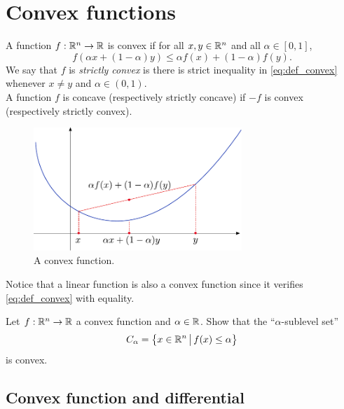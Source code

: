 \documentclass[11pt,nocut]{article}
\begin{document}
\section{Convex functions}

\begin{definition}
	A function $f: \mathbb{R}^n \to \mathbb{R}$ is convex if for all $x,y \in \mathbb{R}^n$ and all $\alpha \in [0,1]$,
	\begin{equation}\label{eq:def_convex}
	f(\alpha x + (1-\alpha) y) \leq \alpha f(x) + (1-\alpha) f(y).
\end{equation}
We say that $f$ is \emph{strictly convex} is there is strict inequality in \eqref{eq:def_convex} whenever $x \neq y$ and $\alpha \in (0,1)$.
\\
A function $f$ is concave (respectively strictly concave) if $-f$ is convex (respectively strictly convex).
\end{definition}
\begin{figure}[h!]
	\begin{center}
	\includegraphics[width=0.7\textwidth]{figures/convex_function.pdf}
	\end{center}
	\caption{A convex function.}
\end{figure}

Notice that a linear function is also a convex function since it verifies \eqref{eq:def_convex} with equality.


\begin{exercise}
	Let $f : \mathbb{R}^n \to \mathbb{R}$ a convex function and $\alpha \in \mathbb{R}$. Show that the ``$\alpha$-sublevel set''
	$$
	C_{\alpha} = \big\{ x \in \mathbb{R}^n \, \big| \, f(x) \leq \alpha \big\}
	$$
	is convex.
\end{exercise}



\subsection{Convex function and differential}
\end{document}
